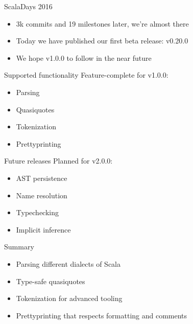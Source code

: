 \documentclass[svgnames,dvipsnames,hyperref={bookmarks=false},usepdftitle=false]{beamer}
\begin{document}
\begin{frame}{ScalaDays 2016}
\begin{itemize}
\item 3k commits and 19 milestones later, we're almost there
\item Today we have published our first beta release: v0.20.0
\item We hope v1.0.0 to follow in the near future
\end{itemize}
\end{frame}

\begin{frame}{Supported functionality}
Feature-complete for v1.0.0:
\begin{itemize}
\item Parsing
\item Quasiquotes
\item Tokenization
\item Prettyprinting
\end{itemize}
\end{frame}

\begin{frame}{Future releases}
Planned for v2.0.0:
\begin{itemize}
\item AST persistence
\item Name resolution
\item Typechecking
\item Implicit inference
\end{itemize}
\end{frame}


\begin{frame}{Summary}
\begin{itemize}
\item Parsing different dialects of Scala
\item Type-safe quasiquotes
\item Tokenization for advanced tooling
\item Prettyprinting that respects formatting and comments
\end{itemize}
\end{frame}

\end{document}
